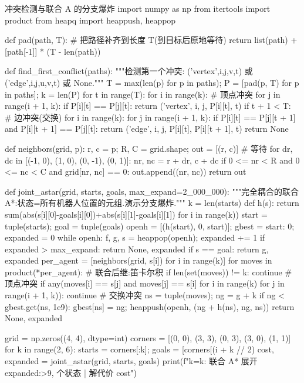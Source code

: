 \begin{codebox}[Python]{冲突检测与联合 A\* 的分支爆炸}
import numpy as np
from itertools import product
from heapq import heappush, heappop

def pad(path, T):                                   # 把路径补齐到长度 T(到目标后原地等待)
    return list(path) + [path[-1]] * (T - len(path))

def find_first_conflict(paths):
    """检测第一个冲突: ('vertex',i,j,v,t) 或 ('edge',i,j,u,v,t) 或 None."""
    T = max(len(p) for p in paths); P = [pad(p, T) for p in paths]; k = len(P)
    for t in range(T):
        for i in range(k):                          # 顶点冲突
            for j in range(i + 1, k):
                if P[i][t] == P[j][t]: return ('vertex', i, j, P[i][t], t)
        if t + 1 < T:                               # 边冲突(交换)
            for i in range(k):
                for j in range(i + 1, k):
                    if P[i][t] == P[j][t + 1] and P[i][t + 1] == P[j][t]:
                        return ('edge', i, j, P[i][t], P[i][t + 1], t)
    return None

def neighbors(grid, p):
    r, c = p; R, C = grid.shape; out = [(r, c)]     # 等待
    for dr, dc in [(-1, 0), (1, 0), (0, -1), (0, 1)]:
        nr, nc = r + dr, c + dc
        if 0 <= nr < R and 0 <= nc < C and grid[nr, nc] == 0: out.append((nr, nc))
    return out

def joint_astar(grid, starts, goals, max_expand=2_000_000):
    """完全耦合的联合 A*:状态=所有机器人位置的元组.演示分支爆炸."""
    k = len(starts)
    def h(s): return sum(abs(s[i][0]-goals[i][0])+abs(s[i][1]-goals[i][1]) for i in range(k))
    start = tuple(starts); goal = tuple(goals)
    openh = [(h(start), 0, start)]; gbest = {start: 0}; expanded = 0
    while openh:
        f, g, s = heappop(openh); expanded += 1
        if expanded > max_expand: return None, expanded
        if s == goal: return g, expanded
        per_agent = [neighbors(grid, s[i]) for i in range(k)]
        for moves in product(*per_agent):           # 联合后继:笛卡尔积
            if len(set(moves)) != k: continue       # 顶点冲突
            if any(moves[i] == s[j] and moves[j] == s[i]
                   for i in range(k) for j in range(i + 1, k)): continue   # 交换冲突
            ns = tuple(moves); ng = g + k
            if ng < gbest.get(ns, 1e9):
                gbest[ns] = ng; heappush(openh, (ng + h(ns), ng, ns))
    return None, expanded

grid = np.zeros((4, 4), dtype=int)
corners = [(0, 0), (3, 3), (0, 3), (3, 0), (1, 1)]
for k in range(2, 6):
    starts = corners[:k]; goals = [corners[(i + k // 2) %
    cost, expanded = joint_astar(grid, starts, goals)
    print(f"k={k}: 联合 A* 展开 {expanded:>9,} 个状态 | 解代价 {cost}")
\end{codebox}

